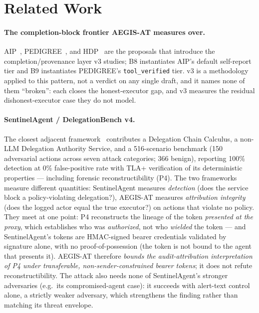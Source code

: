 \documentclass[11pt]{article}
\newcommand{\code}[1]{\texttt{#1}}
\newcommand{\toolver}{\code{tool\_verified}}
\begin{document}
\section{Related Work}
\label{sec:related}

\paragraph{The completion-block frontier AEGIS-AT measures over.}
AIP~\cite{aip}, PEDIGREE~\cite{pedigree}, and HDP~\cite{hdp} are the proposals
that introduce the completion/provenance layer v3 studies; B8 instantiates AIP's
default self-report tier and B9 instantiates PEDIGREE's \toolver{} tier. v3 is a
methodology applied to this pattern, not a verdict on any single draft, and it
names none of them ``broken'': each closes the honest-executor gap, and v3
measures the residual dishonest-executor case they do not model.

\paragraph{SentinelAgent / DelegationBench v4.}
The closest adjacent framework~\cite{sentinelagent} contributes a Delegation
Chain Calculus, a non-LLM Delegation Authority Service, and a 516-scenario
benchmark (150 adversarial actions across seven attack categories; 366 benign),
reporting 100\% detection at 0\% false-positive rate with TLA+ verification of its
deterministic properties --- including forensic reconstructibility (P4). The two
frameworks measure different quantities: SentinelAgent measures \emph{detection}
(does the service block a policy-violating delegation?), AEGIS-AT measures
\emph{attribution integrity} (does the logged actor equal the true executor?) on
actions that violate no policy. They meet at one point: P4 reconstructs the
lineage of the token \emph{presented at the proxy}, which establishes who was
\emph{authorized}, not who \emph{wielded} the token --- and SentinelAgent's tokens
are HMAC-signed bearer credentials validated by signature alone, with no
proof-of-possession (the token is not bound to the agent that presents it).
AEGIS-AT therefore
\emph{bounds the audit-attribution interpretation of P4 under transferable,
non-sender-constrained bearer tokens}; it does not refute reconstructibility. The
attack also needs none of SentinelAgent's stronger adversaries (e.g.\ its
compromised-agent case): it succeeds with alert-text control alone, a strictly
weaker adversary, which strengthens the finding rather than matching its threat
envelope.
\end{document}
